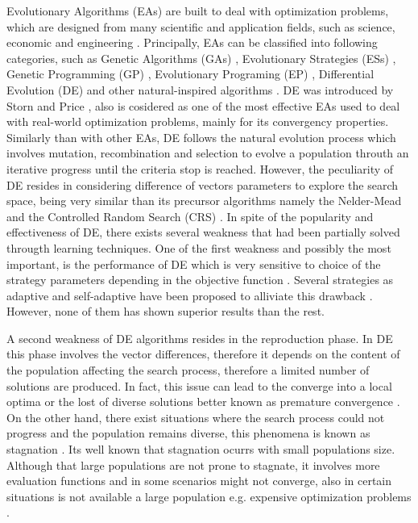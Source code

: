 Evolutionary Algorithms (EAs) are built to deal with optimization problems, which are designed from many scientific and application fields, such as science, economic and engineering \cite{noman2008differential, chakraborty2008advances}.
%
Principally, EAs can be classified into following categories, such as Genetic Algorithms (GAs) \cite{srinivas1994genetic, schwefel1977numerische} , Evolutionary Strategies (ESs) \cite{john1992holland}, Genetic Programming (GP) \cite{koza1992genetic}, Evolutionary Programing (EP) \cite{fogel1991meta}, Differential Evolution (DE) \cite{storn1997differential} and other natural-inspired algorithms \cite{das2011differential}.
%
%
DE was introduced by Storn and Price \cite{storn1997differential}, also is cosidered as one of the most effective EAs used to deal with real-world optimization problems, mainly for its convergency properties.
%
Similarly than with other EAs, DE follows the natural evolution process which involves mutation, recombination and selection to evolve a population throuth an iterative progress until the criteria stop is reached.
%
However, the peculiarity of DE resides in considering difference of vectors parameters to explore the search space, being very similar than its precursor algorithms namely the Nelder-Mead \cite{nelder1965simplex} and the Controlled Random Search (CRS) \cite{price1983global}.
%
In spite of the popularity and effectiveness of DE, there exists several weakness that had been partially solved througth learning techniques.
%
One of the first weakness and possibly the most important, is the performance of DE which is very sensitive to choice of the strategy parameters depending in the objective function \cite{gamperle2002parameter}.
%
Several strategies as adaptive and self-adaptive have been proposed to alliviate this drawback \cite{brest2006self, zhang2009jade}.
%
However, none of them has shown superior results than the rest.
%

A second weakness of DE algorithms resides in the reproduction phase.
%
In DE this phase involves the vector differences, therefore it depends on the content of the population affecting the search process, therefore a limited number of solutions are produced.
%
In fact, this issue can lead to the converge into a local optima or the lost of diverse solutions better known as premature convergence \cite{sa2008exploration}.
%
On the other hand, there exist situations where the search process could not progress and the population remains diverse, this phenomena is known as stagnation \cite{lampinen2000stagnation}.
%
Its well known that stagnation ocurrs with small populations size.
%
Although that large populations are not prone to stagnate, it involves more evaluation functions and in some scenarios might not converge, also in certain situations is not available a large population e.g. expensive optimization problems \cite{chen2014problem}.

